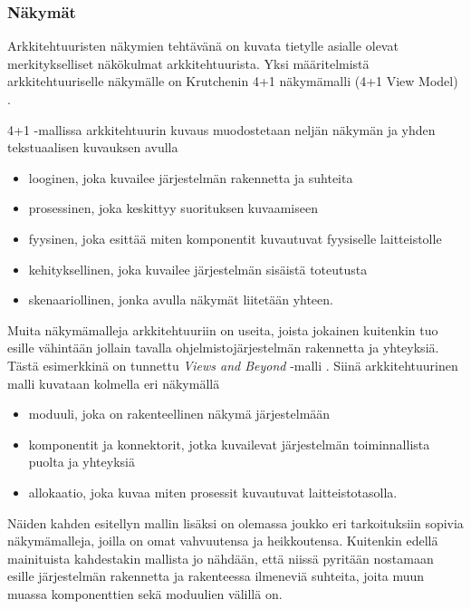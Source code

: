 \documentclass[finnish]{tktltiki2}
\numberwithin{table}{section}
\theoremstyle{definition}
\theoremstyle{remark}
\begin{document}
\subsubsection{Näkymät}
Arkkitehtuuristen näkymien tehtävänä on kuvata tietylle asialle olevat merkitykselliset näkökulmat arkkitehtuurista. Yksi määritelmistä arkkitehtuuriselle näkymälle on Krutchenin 4+1 näkymämalli (4+1 View Model) \citep{krutchen1995}. 

4+1 -mallissa arkkitehtuurin kuvaus muodostetaan neljän näkymän ja yhden tekstuaalisen kuvauksen avulla 

\begin{itemize}
	\item looginen, joka kuvailee järjestelmän rakennetta ja suhteita
	\item prosessinen, joka keskittyy suorituksen kuvaamiseen
	\item fyysinen, joka esittää miten komponentit kuvautuvat fyysiselle laitteistolle
	\item kehityksellinen, joka kuvailee järjestelmän sisäistä toteutusta
	\item skenaariollinen, jonka avulla näkymät liitetään yhteen.
\end{itemize}
 
Muita näkymämalleja arkkitehtuuriin on useita, joista jokainen kuitenkin tuo esille vähintään jollain tavalla ohjelmistojärjestelmän rakennetta ja yhteyksiä. Tästä esimerkkinä on tunnettu \textit{Views and Beyond} -malli \citep{Clements:2002:DSA:599933}. Siinä arkkitehtuurinen malli kuvataan kolmella eri näkymällä

\begin{itemize}
	\item moduuli, joka on rakenteellinen näkymä järjestelmään
	\item komponentit ja konnektorit, jotka kuvailevat järjestelmän toiminnallista puolta ja yhteyksiä
	\item allokaatio, joka kuvaa miten prosessit kuvautuvat laitteistotasolla.
\end{itemize}
 
Näiden kahden esitellyn mallin lisäksi on olemassa joukko eri tarkoituksiin sopivia näkymämalleja, joilla on omat vahvuutensa ja heikkoutensa. Kuitenkin edellä mainituista kahdestakin mallista jo nähdään, että niissä pyritään nostamaan esille järjestelmän rakennetta ja rakenteessa ilmeneviä suhteita, joita muun muassa komponenttien sekä moduulien välillä on.
\end{document}
